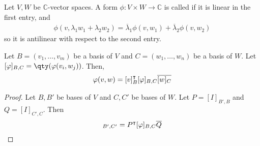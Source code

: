\begin{definition}
	Let $V, W$ be $\mathbb C$-vector spaces.
	A form $\phi \colon V \times W \to \mathbb C$ is called  if it is linear in the first entry, and
	\begin{align*}
		\phi(v, \lambda_1 w_1 + \lambda_2 w_2) = \overline \lambda_1 \phi(v,w_1) + \overline \lambda_2 \phi(v,w_2)
	\end{align*}
	so it is antilinear with respect to the second entry.
\end{definition}

\begin{lemma}
	Let $B = (v_1, \dots, v_m)$ be a basis of $V$ and $C = (w_1, \dots, w_n)$ be a basis of $W$.
	Let $[\phi]_{B,C} = \qty(\phi(v_i, w_j))$.
	Then,
	\begin{align*}
		\varphi(v,w) = [v]_B^\intercal [\varphi]_{B,C} \overline{[w]_C}
	\end{align*}
\end{lemma}
\begin{proof}
	Let $B, B'$ be bases of $V$ and $C, C'$ be bases of $W$.
	Let $P = [I]_{B', B}$ and $Q = [I]_{C', C}$.
	Then
	\begin{align*}
		[\phi]_{B', C'} = P^\transpose [\phi]_{B,C} \overline Q
	\end{align*}
\end{proof}

